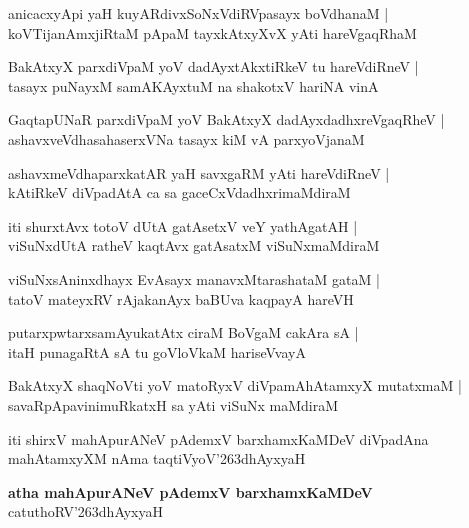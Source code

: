 \begin{shloka}
anicacxyApi yaH kuyARdivxSoNxVdiRVpasayx boVdhanaM |\\
koVTijanAmxjiRtaM pApaM tayxkAtxyXvX yAti hareVgaqRhaM
\end{shloka}

\begin{shloka}
BakAtxyX parxdiVpaM yoV dadAyxtAkxtiRkeV tu hareVdiRneV |\\
tasayx puNayxM samAKAyxtuM na shakotxV hariNA vinA
\end{shloka}

\begin{shloka}
GaqtapUNaR parxdiVpaM yoV BakAtxyX dadAyxdadhxreVgaqRheV |\\
ashavxveVdhasahaserxVNa tasayx kiM vA parxyoVjanaM 
\end{shloka}

\begin{shloka}
ashavxmeVdhaparxkatAR yaH savxgaRM yAti hareVdiRneV |\\
kAtiRkeV diVpadAtA ca sa gaceCxVdadhxrimaMdiraM 
\end{shloka}

\begin{shloka}
iti shurxtAvx totoV dUtA gatAsetxV veY yathAgatAH |\\
viSuNxdUtA ratheV kaqtAvx gatAsatxM viSuNxmaMdiraM
\end{shloka}

\begin{shloka}
viSuNxsAninxdhayx EvAsayx manavxMtarashataM gataM |\\
tatoV mateyxRV rAjakanAyx baBUva kaqpayA hareVH
\end{shloka}

\begin{shloka}
putarxpwtarxsamAyukatAtx ciraM BoVgaM cakAra sA |\\
itaH punagaRtA sA tu goVloVkaM hariseVvayA
\end{shloka}

\begin{shloka}
BakAtxyX shaqNoVti yoV matoRyxV diVpamAhAtamxyX mutatxmaM |\\
savaRpApavinimuRkatxH sa yAti viSuNx maMdiraM 
\end{shloka}
iti shirxV mahApurANeV pAdemxV barxhamxKaMDeV diVpadAna mahAtamxyXM nAma taqtiVyoV\char'263dhAyxyaH

\begin{center}
\textbf{\large atha mahApurANeV pAdemxV barxhamxKaMDeV}\\
catuthoRV\char'263dhAyxyaH
\end{center}

